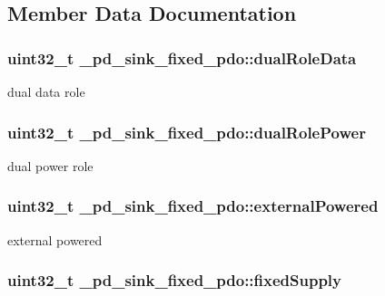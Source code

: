 \subsection{Member Data Documentation}
\hypertarget{struct__pd__sink__fixed__pdo_a6e8fb8552ee54c1d0227a03b5d7aecbf}{
\subsubsection[{dual\-Role\-Data}]{\setlength{\rightskip}{0pt plus 5cm}uint32\-\_\-t \-\_\-pd\-\_\-sink\-\_\-fixed\-\_\-pdo\-::dual\-Role\-Data}}\label{struct__pd__sink__fixed__pdo_a6e8fb8552ee54c1d0227a03b5d7aecbf}
dual data role \hypertarget{struct__pd__sink__fixed__pdo_a9ff5e34e2bf3e62a6b4dc017f559c061}{
\subsubsection[{dual\-Role\-Power}]{\setlength{\rightskip}{0pt plus 5cm}uint32\-\_\-t \-\_\-pd\-\_\-sink\-\_\-fixed\-\_\-pdo\-::dual\-Role\-Power}}\label{struct__pd__sink__fixed__pdo_a9ff5e34e2bf3e62a6b4dc017f559c061}
dual power role \hypertarget{struct__pd__sink__fixed__pdo_a44e4b2e4bc2b34929036acee6ff6ae34}{
\subsubsection[{external\-Powered}]{\setlength{\rightskip}{0pt plus 5cm}uint32\-\_\-t \-\_\-pd\-\_\-sink\-\_\-fixed\-\_\-pdo\-::external\-Powered}}\label{struct__pd__sink__fixed__pdo_a44e4b2e4bc2b34929036acee6ff6ae34}
external powered \hypertarget{struct__pd__sink__fixed__pdo_a9290ef90d4336be4642f40aac2da8f5e}{
\subsubsection[{fixed\-Supply}]{\setlength{\rightskip}{0pt plus 5cm}uint32\-\_\-t \-\_\-pd\-\_\-sink\-\_\-fixed\-\_\-pdo\-::fixed\-Supply}}\label{struct__pd__sink__fixed__pdo_a9290ef90d4336be4642f40aac2da8f5e}
